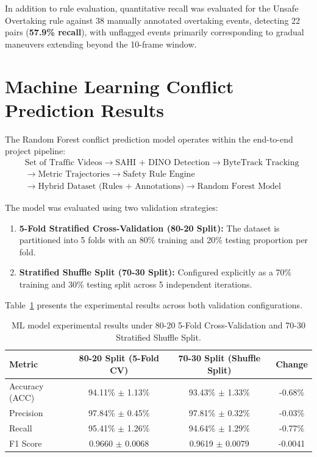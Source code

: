 \documentclass[12pt,a4paper]{report}
\begin{document}
In addition to rule evaluation, quantitative recall was evaluated for the Unsafe Overtaking rule against 38 manually annotated overtaking events, detecting 22 pairs (\textbf{57.9\% recall}), with unflagged events primarily corresponding to gradual maneuvers extending beyond the 10-frame window.

\section{Machine Learning Conflict Prediction Results}

The Random Forest conflict prediction model operates within the end-to-end project pipeline:
\begin{align*}
&\text{Set of Traffic Videos} \rightarrow \text{SAHI + DINO Detection} \rightarrow \text{ByteTrack Tracking} \\
&\rightarrow \text{Metric Trajectories} \rightarrow \text{Safety Rule Engine} \\
&\rightarrow \text{Hybrid Dataset (Rules + Annotations)} \rightarrow \text{Random Forest Model}
\end{align*}

The model was evaluated using two validation strategies:
\begin{enumerate}
    \item \textbf{5-Fold Stratified Cross-Validation (80-20 Split):} The dataset is partitioned into 5 folds with an 80\% training and 20\% testing proportion per fold.
    \item \textbf{Stratified Shuffle Split (70-30 Split):} Configured explicitly as a 70\% training and 30\% testing split across 5 independent iterations.
\end{enumerate}

Table~\ref{tab:ml_validation_comparison} presents the experimental results across both validation configurations.

\begin{table}[H]
\centering
\caption{ML model experimental results under 80-20 5-Fold Cross-Validation and 70-30 Stratified Shuffle Split.}
\label{tab:ml_validation_comparison}
\begin{tabular}{lccc}
\toprule
\textbf{Metric} & \textbf{80-20 Split (5-Fold CV)} & \textbf{70-30 Split (Shuffle Split)} & \textbf{Change} \\
\midrule
Accuracy (ACC) & 94.11\% $\pm$ 1.13\% & 93.43\% $\pm$ 1.33\% & -0.68\% \\
Precision      & 97.84\% $\pm$ 0.45\% & 97.81\% $\pm$ 0.32\% & -0.03\% \\
Recall         & 95.41\% $\pm$ 1.26\% & 94.64\% $\pm$ 1.29\% & -0.77\% \\
F1 Score       & 0.9660 $\pm$ 0.0068  & 0.9619 $\pm$ 0.0079  & -0.0041 \\
\bottomrule
\end{tabular}
\end{table}
\end{document}
